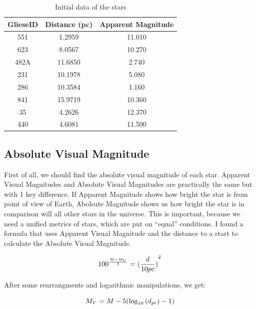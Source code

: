 \documentclass[a4paper,10pt]{article}
\begin{document}
  \begin{table}[h!]
    \begin{center}
      \caption{Initial data of the stars}
      \begin{tabular}{c | c | c}
        \textbf{GlieseID} & \textbf{Distance (pc)} & \textbf{Apparent Magnitude} \\
        \hline
        551 & 1.2959 & 11.010\\
        623 & 8.0567 & 10.270\\
        482A & 11.6850 & 2.740\\
        231 & 10.1978 & 5.080\\
        286 & 10.3584 & 1.160\\
        841 & 15.9719 & 10.360\\
        35 & 4.2626 & 12.370\\
        440 & 4.6081 & 11.500\\
      \end{tabular}
      \label{data}
    \end{center}
  \end{table}
  
  \subsection{Absolute Visual Magnitude}

  First of all, we should find the absolute visual magnitude of each star. Apparent Visual Magnitudes and Absolute Visual Magnitudes are practically the same but with 1 key difference. If Apparent Magnitude shows how bright the star is from point of view of Earth, Abolsute Magnitude shows us how bright the star is in comparison will all other stars in the universe. This is important, because we need a unified metrics of stars, which are put on ``equal'' conditions. I found a formula that uses Apparent Visual Magnitude and the distance to a start to calculate the Absolute Visual Magnitude. 
  
  \begin{equation}
    {100}^{\frac{M-M_V}{5}} = {(\frac{d}{10pc})}^2\\
  \end{equation}

  After some rearrangments and logarithmic manipulations, we get:

  \begin{equation}
    M_V = M - 5(\log_{10}{(d_{pc})}-1)\\
    \end{equation}
    
\end{document}

